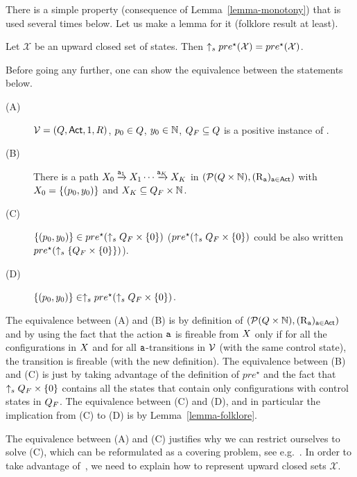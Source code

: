 \documentclass[envcountsame,a4paper,12pt]{llncs}
\begin{document}
  There is a simple property (consequence of Lemma~\ref{lemma-monotony})
  that is used several times below. Let us make a lemma for it (folklore result at least).

  \begin{lemma}\label{lemma-folklore}
    Let $\mathcal{X}$ be an upward closed set of states.
    Then $\uparrow_s pre^{\star}(\mathcal{X}) =  pre^{\star}(\mathcal{X})$. 
    \end{lemma}

  Before going any further, one can show the equivalence between the statements below.
  \begin{description}
  \item[(A)] $\mathcal{V} = (Q,{\rm \sf Act},1,R)$,
    $p_0 \in Q$, $y_0 \in \mathbb{N}$, $Q_F \subseteq Q$
    is a positive instance of \ourvasspb. 
  \item[(B)] There is a path $\aset_0 \step{\aaction_1} \aset_1 \cdots \step{\aaction_{K}} \aset_K$
    in $({\cal P}(Q \times \mathbb{N}),(\operatorname{R}_{\mathtt{a}})_{\mathtt{a} \in {\rm \sf Act}})$
    with $X_0 = \{ (p_0,y_0) \}$
    and $X_K \subseteq Q_F \times \mathbb{N}$.     
  \item[(C)] $\{ (p_0,y_0) \} \in pre^{\star}(\uparrow_{s} Q_F \times \{ 0 \})$
    ($pre^{\star}(\uparrow_{s} Q_F \times \{ 0 \})$ could be also written
     $pre^{\star}(\uparrow_{s} \{ Q_F \times \{ 0 \} \})$).
  \item[(D)]
    $\{ (p_0,y_0) \} \in \uparrow_{s}
    pre^{\star}(\uparrow_{s} Q_F \times \{ 0 \})$.
  \end{description}
  The equivalence between (A) and (B) is by definition of
  $({\cal P}(Q \times \mathbb{N}),(\operatorname{R}_{\mathtt{a}})_{\mathtt{a} \in {\rm \sf Act}})$ and by using the fact that
  the action $\mathtt{a}$ is fireable from $X$ only if for all the configurations in $X$
  and for all $\mathtt{a}$-transitions in $\mathcal{V}$ (with the same control state), the transition is
  fireable (with the new definition).
  The equivalence between (B) and (C) is just by taking advantage of the definition
  of $pre^{\star}$ and the fact that $\uparrow_{s} Q_F \times \{ 0 \}$
  contains all the states that contain only configurations with control states in $Q_F$.
  The equivalence between (C) and (D), and in particular the implication from (C) to (D) is by 
  Lemma~\ref{lemma-folklore}. 

  The equivalence between (A) and (C) justifies why we can restrict ourselves to solve
  (C), which can be reformulated as a covering problem, see e.g.~\cite{Finkel&Schnoebelen01}.
  In order to take advantage of~\cite[Theorem 3.6]{Finkel&Schnoebelen01}, we need to explain how to represent
  upward closed sets $\mathcal{X}$.
\end{document}
